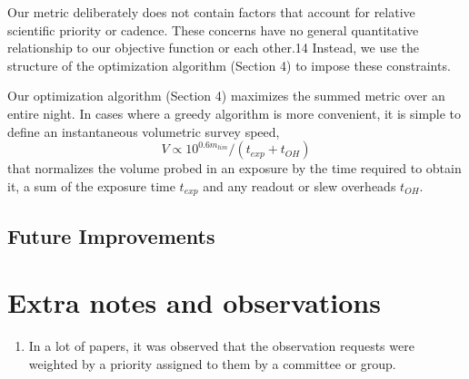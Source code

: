 \documentclass{article}
\begin{document}
Our metric deliberately does not contain factors that account
for relative scientific priority or cadence. These concerns have
no general quantitative relationship to our objective function or
each other.14 Instead, we use the structure of the optimization
algorithm (Section 4) to impose these constraints.

Our optimization algorithm (Section 4) maximizes the
summed metric over an entire night. In cases where a greedy
algorithm is more convenient, it is simple to define an
instantaneous volumetric survey speed, \[V \propto 10^{0.6m_{lim}}/(t_{exp}+t_{OH})\]
that normalizes the volume probed in an exposure by the time
required to obtain it, a sum of the exposure time \(t_{exp}\) and any
readout or slew overheads \(t_{OH}\).


\subsection*{Future Improvements}

\section*{Extra notes and observations}
\begin{enumerate}
    \item In a lot of papers, it was observed that the observation requests were weighted by a priority assigned to them by a committee or group.
\end{enumerate}

\printbibliography
\end{document}
